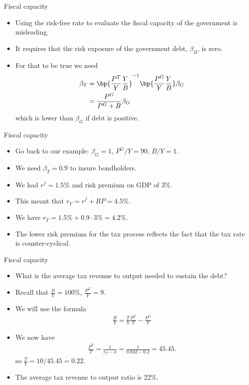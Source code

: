 \documentclass[11pt,xcolor={dvipsnames},aspectratio=159,hyperref={pdftex,pdfpagemode=UseNone,hidelinks,pdfdisplaydoctitle=true},usepdftitle=false]{beamer}
\begin{document}
\begin{frame}{Fiscal capacity}  
    \begin{itemize}
    \item Using the risk-free rate to evaluate the fiscal capacity of the government is misleading.
    \item It requires that the risk exposure of the government debt, $\beta_B$, is zero. 
    \item For that to be true we need 
    \begin{align*}
        \beta_T  & =\bp{\frac{P^T}{Y}\frac{Y}{B}}^{-1}  \bp{\frac{P^G}{Y}\frac{Y}{B}} \beta_G \\
            & = \frac{P^G}{P^G+B} \beta_G
    \end{align*}
    which is lower than $\beta_G$ if debt is positive.
    \end{itemize}
\end{frame}

\begin{frame}{Fiscal capacity}  
    \begin{itemize}
    \item Go back to our example: $\beta_G = 1$, $P^G/Y = 90$, $B/Y=1$.
    \item We need $\beta_T = 0.9$ to insure bondholders.
    \item We had $r^f = 1.5\%$ and risk premium on GDP of 3\%.
    \item This meant that $r_Y = r^f + RP = 4.5\%$.
    \item We have $r_T = 1.5\% + 0.9 \cdot 3\% = 4.2\%$.
    \item The lower risk premium for the tax process reflects the fact that the tax rate is
    counter-cyclical.
    \end{itemize}
\end{frame}

\begin{frame}{Fiscal capacity}  
    \begin{itemize}
    \item What is the average tax revenue to output needed to sustain the debt?
    \item Recall that $\frac{B}{Y} = 100\%$, $\frac{P^G}{Y} = 9$.
    \item We will use the formula \begin{align*}
        \frac{B}{Y} = \frac{T}{Y} \frac{P^T}{T}  - \frac{P^G}{Y}
    \end{align*}
    \item We now have \begin{align*}
    \frac{P^T}{T} = \frac{1}{r_T - x} = \frac{1}{0.042-0.2} = 45.45.  
    \end{align*}
    so $\frac{T}{Y} = 10 / 45.45 = 0.22$.
    \item The average tax revenue to output ratio is 22\%.
    \end{itemize}
\end{frame}
\end{document}
